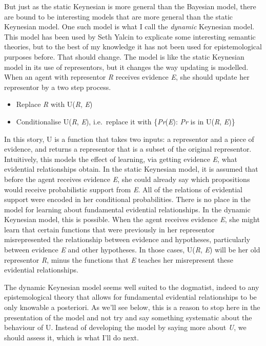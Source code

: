 \documentclass[
  10pt,
  letterpaper,
  DIV=11,
  numbers=noendperiod,
  twoside]{scrartcl}
\providecommand{\tightlist}{%
  \setlength{\itemsep}{0pt}\setlength{\parskip}{0pt}}\usepackage{longtable,booktabs,array}
\begin{document}
But just as the static Keynesian is more general than the Bayesian
model, there are bound to be interesting models that are more general
than the static Keynesian model. One such model is what I call the
\emph{dynamic} Keynesian model. This model has been used by Seth Yalcin
to explicate some interesting semantic theories, but to the best of my
knowledge it has not been used for epistemological purposes before. That
should change. The model is like the static Keynesian model in its use
of representors, but it changes the way updating is modelled. When an
agent with representor \emph{R} receives evidence \emph{E}, she should
update her representor by a two step process.

\begin{itemize}
\tightlist
\item
  Replace \emph{R} with U(\emph{R}, \emph{E})
\item
  Conditionalise U(\emph{R}, \emph{E}), i.e.~replace it with
  \{\emph{Pr}(\emph{E}): \emph{Pr} is in U(\emph{R}, \emph{E})\}
\end{itemize}

In this story, U is a function that takes two inputs: a representor and
a piece of evidence, and returns a representor that is a subset of the
original representor. Intuitively, this models the effect of learning,
via getting evidence \emph{E}, what evidential relationships obtain. In
the static Keynesian model, it is assumed that before the agent receives
evidence \emph{E}, she could already say which propositions would
receive probabilistic support from \emph{E}. All of the relations of
evidential support were encoded in her conditional probabilities. There
is no place in the model for learning about fundamental evidential
relationships. In the dynamic Keynesian model, this is possible. When
the agent receives evidence \emph{E}, she might learn that certain
functions that were previously in her representor misrepresented the
relationship between evidence and hypotheses, particularly between
evidence \emph{E} and other hypotheses. In those cases, U(\emph{R},
\emph{E}) will be her old representor \emph{R}, minus the functions that
\emph{E} teaches her misrepresent these evidential relationships.

The dynamic Keynesian model seems well suited to the dogmatist, indeed
to any epistemological theory that allows for fundamental evidential
relationships to be only knowable a posteriori. As we'll see below, this
is a reason to stop here in the presentation of the model and not try
and say something systematic about the behaviour of U. Instead of
developing the model by saying more about \emph{U}, we should assess it,
which is what I'll do next.
\end{document}
